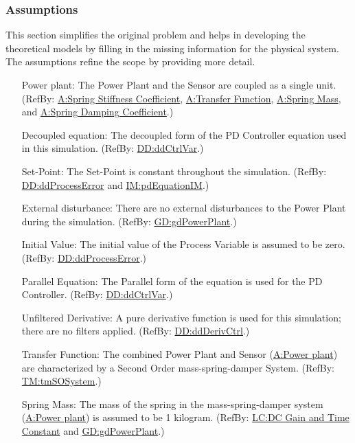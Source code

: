 \documentclass[12pt]{article}
\begin{document}
\subsubsection{Assumptions}
\label{Sec:Assumps}
This section simplifies the original problem and helps in developing the theoretical models by filling in the missing information for the physical system. The assumptions refine the scope by providing more detail.

\begin{itemize}
\item[Power plant:\phantomsection\label{pwrPlant}]{The Power Plant and the Sensor are coupled as a single unit. (RefBy: \hyperref[stiffnessCoeffSpring]{A:Spring Stiffness Coefficient}, \hyperref[pwrPlantTxFnx]{A:Transfer Function}, \hyperref[massSpring]{A:Spring Mass}, and \hyperref[dampingCoeffSpring]{A:Spring Damping Coefficient}.)}
\item[Decoupled equation:\phantomsection\label{decoupled}]{The decoupled form of the PD Controller equation used in this simulation. (RefBy: \hyperref[DD:ddCtrlVar]{DD:ddCtrlVar}.)}
\item[Set-Point:\phantomsection\label{setPoint}]{The Set-Point is constant throughout the simulation. (RefBy: \hyperref[DD:ddProcessError]{DD:ddProcessError} and \hyperref[IM:pdEquationIM]{IM:pdEquationIM}.)}
\item[External disturbance:\phantomsection\label{externalDisturb}]{There are no external disturbances to the Power Plant during the simulation. (RefBy: \hyperref[GD:gdPowerPlant]{GD:gdPowerPlant}.)}
\item[Initial Value:\phantomsection\label{initialValue}]{The initial value of the Process Variable is assumed to be zero. (RefBy: \hyperref[DD:ddProcessError]{DD:ddProcessError}.)}
\item[Parallel Equation:\phantomsection\label{parallelEq}]{The Parallel form of the equation is used for the PD Controller. (RefBy: \hyperref[DD:ddCtrlVar]{DD:ddCtrlVar}.)}
\item[Unfiltered Derivative:\phantomsection\label{unfilteredDerivative}]{A pure derivative function is used for this simulation; there are no filters applied. (RefBy: \hyperref[DD:ddDerivCtrl]{DD:ddDerivCtrl}.)}
\item[Transfer Function:\phantomsection\label{pwrPlantTxFnx}]{The combined Power Plant and Sensor (\hyperref[pwrPlant]{A:Power plant}) are characterized by a Second Order mass-spring-damper System. (RefBy: \hyperref[TM:tmSOSystem]{TM:tmSOSystem}.)}
\item[Spring Mass:\phantomsection\label{massSpring}]{The mass of the spring in the mass-spring-damper system (\hyperref[pwrPlant]{A:Power plant}) is assumed to be 1 kilogram. (RefBy: \hyperref[likeChgPP]{LC:DC Gain and Time Constant} and \hyperref[GD:gdPowerPlant]{GD:gdPowerPlant}.)}

\end{itemize}
\end{document}
